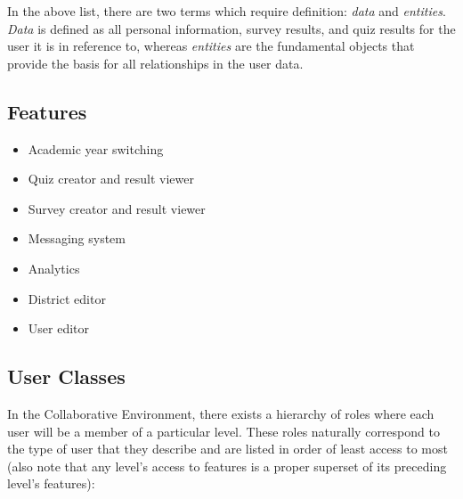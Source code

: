 \documentclass[letterpaper,12pt]{report}
\begin{document}
In the above list, there are two terms which require definition: \emph{data} and \emph{entities}. \emph{Data} is defined as all personal information, survey results, and quiz results for the user it is in reference to, whereas \emph{entities} are the fundamental objects that provide the basis for all relationships in the user data.

\subsection*{Features}

\begin{itemize}
	\item Academic year switching
	\item Quiz creator and result viewer
	\item Survey creator and result viewer
	\item Messaging system
	\item Analytics
	\item District editor
	\item User editor
\end{itemize}

\subsection*{User Classes}

In the Collaborative Environment, there exists a hierarchy of roles where each user will be a member of a particular level. These roles naturally correspond to the type of user that they describe and are listed in order of least access to most (also note that any level's access to features is a proper superset of its preceding level's features):
\end{document}
